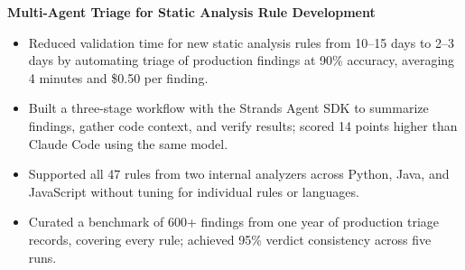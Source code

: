 \documentclass{resume}
\newcommand{\project}[1]{\par\addvspace{0.7ex}\Needspace{4\baselineskip}\textbf{#1}\par}
\begin{document}


\project{Multi-Agent Triage for Static Analysis Rule Development}
\begin{itemize}
\item Reduced validation time for new static analysis rules from 10--15 days to 2--3 days by automating triage of production findings at 90\% accuracy, averaging 4 minutes and \$0.50 per finding.
\item Built a three-stage workflow with the Strands Agent SDK to summarize findings, gather code context, and verify results; scored 14 points higher than Claude Code using the same model.
\item Supported all 47 rules from two internal analyzers across Python, Java, and JavaScript without tuning for individual rules or languages.
\item Curated a benchmark of 600+ findings from one year of production triage records, covering every rule; achieved 95\% verdict consistency across five runs.
\end{itemize}
\end{document}
